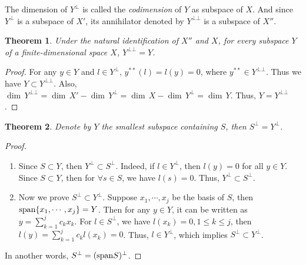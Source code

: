 \documentclass[11pt]{book}
\newtheorem{theorem}{Theorem}[chapter]
\theoremstyle{definition}
\numberwithin{equation}{chapter}
\begin{document}
\medskip

The dimension of $Y^\bot$ is called the \emph{codimension} of $Y$ as subspace of $X$. And since $Y^\bot$ is a subspace of $X'$, its annihilator denoted by $Y^{\bot \bot}$ is a subspace of $X''$.

\medskip

\begin{theorem}
Under the natural identification of $X''$ and $X$, for every subspace $Y$ of a finite-dimensional space $X$, $Y^{\bot\bot} = Y$.
\end{theorem}
\begin{proof}
For any $y\in Y$ and $l\in Y^\bot$, $y^{**}(l) = l(y) = 0$, where $y^{**} \in Y^{\bot\bot}$. Thus we have $Y\subset Y^{\bot\bot}$. Also, $ \dim \,Y^{\bot\bot} =  \dim \,X' -  \dim \,Y^\bot =  \dim \,X -  \dim \,Y^\bot =  \dim \,Y$. Thus, $Y = Y^{\bot\bot}$.
\end{proof}

\medskip

\begin{theorem}
Denote by $Y$ the smallest subspace containing $S$, then $S^\bot = Y^\bot$.
\end{theorem}
\begin{proof}
~\begin{enumerate}[label=(\alph*)]
    \item Since $S\subset Y$, then $Y^\bot\subset S^\bot$. Indeed, if $l\in Y^\bot$, then $l(y) = 0$ for all $y\in Y$. Since $S\subset Y$, then for $\forall s\in S$, we have $l(s) = 0$. Thus, $Y^\bot\subset S^\bot$. 
    \item Now we prove $S^\bot\subset Y^\bot$. Suppose $x_1,\cdots,x_j$ be the basis of $S$, then ${\rm span}\{x_1,\cdots,x_j\} = Y$. Then for any $y\in Y$, it can be written as $y = \sum^j_{k=1}c_k x_k$. For $l\in S^\bot$, we have $l(x_k) = 0, 1\leq k \leq j$, then $l(y) = \sum^j_{k=1}c_k l(x_k) = 0$. Thus, $l\in Y^\bot$, which implies $S^\bot\subset Y^\bot$. 
\end{enumerate}
In another words, $S^\bot = ({\rm span} S)^\bot$.
\end{proof}

\medskip
\end{document}
